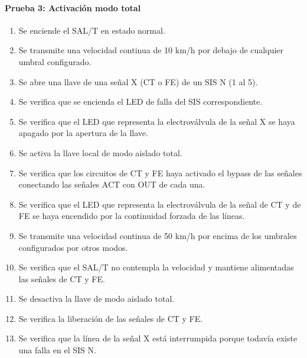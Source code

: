 \paragraph{Prueba 3: Activación modo total}
\begin{enumerate}
\item	Se enciende el SAL/T en estado normal.
\item	Se transmite una velocidad continua de 10 km/h por debajo de cualquier umbral configurado.
\item	Se abre una llave de una señal X (CT o FE) de un SIS N (1 al 5).
\item	Se verifica que se encienda el LED de falla del SIS correspondiente.
\item	Se verifica que el LED que representa la electroválvula de la señal X se haya apagado por la apertura de la llave.
\item	Se activa la llave local de modo aislado total.
\item	Se verifica que los circuitos de CT y FE haya activado el bypass de las señales conectando las señales ACT con OUT de cada una.
\item	Se verifica que el LED que representa la electroválvula de la señal de CT y de FE se haya encendido por la continuidad forzada de las líneas.
\item	Se transmite una velocidad continua de 50 km/h por encima de los umbrales configurados por otros modos.
\item	Se verifica que el SAL/T no contempla la velocidad y mantiene alimentadas las señales de CT y FE.
\item	Se desactiva la llave de modo aislado total.
\item	Se verifica la liberación de las señales de CT y FE.
\item	Se verifica que la línea de la señal X está interrumpida porque todavía existe una falla en el SIS N.

\end{enumerate}

